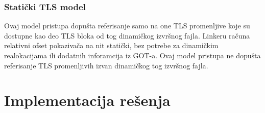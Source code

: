 \documentclass[12pt,oneside]{memoir}
\begin{document}
\subsection{Statički TLS model}

Ovaj model pristupa dopušta referisanje samo na one TLS promenljive koje su dostupne kao deo TLS bloka od tog dinamičkog izvršnog fajla. Linkeru računa relativni ofset pokazivača na nit statički, bez potrebe za dinamičkim realokacijama ili dodatnih inforamcija iz GOT-a. Ovaj model pristupa ne dopušta referisanje TLS promenljivih izvan dinamičkog tog izvršnog fajla.

\chapter{Implementacija rešenja}
\label{chp:Implementacija}
\end{document}
